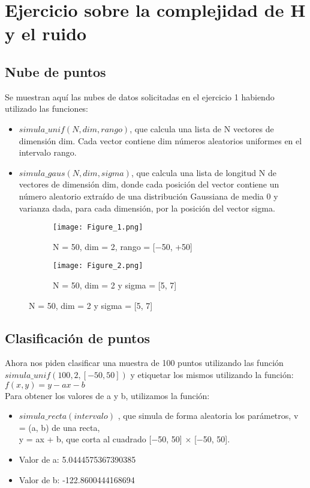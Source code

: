 \chapter{Ejercicio sobre la complejidad de H y el ruido}
\section{Nube de puntos}
Se muestran aquí las nubes de datos solicitadas en el ejercicio 1 habiendo utilizado las funciones:
\begin{itemize}
   \item $ simula\_unif (N, dim, rango) $, que calcula una lista de N vectores de dimensión dim. Cada
vector contiene dim números aleatorios uniformes en el intervalo rango.
   \item $ simula\_gaus(N, dim, sigma) $, que calcula una lista de longitud N de vectores de dimensión dim, donde cada posición del vector contiene un número aleatorio extraído de una distribución Gaussiana de media 0 y varianza dada, para cada dimensión, por la posición del vector sigma.
\end{itemize}


\begin{figure}[h]
   \centering
   \begin{subfigure}[b]{0.5\textwidth}
      \texttt{[image: Figure\_1.png]}
      \caption{N = 50, dim = 2, rango = [−50, +50]}
   \end{subfigure}
   \hfill
   \begin{subfigure}[b]{0.5\textwidth}
      \texttt{[image: Figure\_2.png]}
      \caption{N = 50, dim = 2 y sigma = [5, 7]}
   \end{subfigure}
\end{figure}

\newpage
\section{Clasificación de puntos}
Ahora nos piden clasificar una muestra de 100 puntos utilizando las función $ simula\_unif (100, 2, [−50, 50]) $ y etiquetar los mismos utilizando la función: $ f(x,y) = y - ax -b $\\
Para obtener los valores de a y b, utilizamos la función:
\begin{itemize}
   \item $ simula\_recta(intervalo) $ , que simula de forma aleatoria los parámetros, v = (a, b) de una recta, \\y = ax + b, que corta al cuadrado [−50, 50] × [−50, 50].
   \item Valor de a: 5.0444575367390385
   \item Valor de b: -122.8600444168694
\end{itemize}

